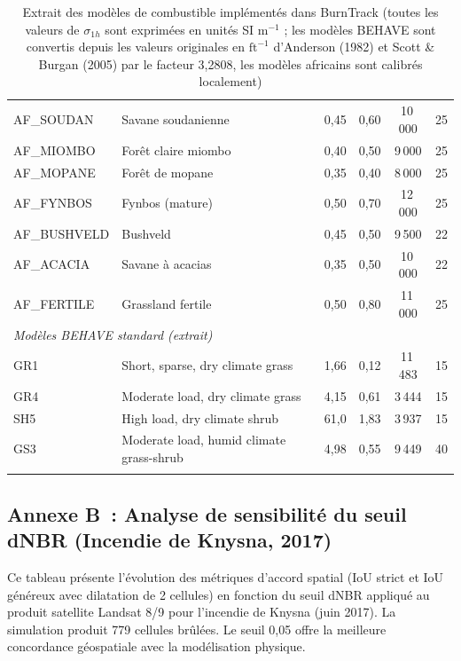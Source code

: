 \begin{small}
\begin{longtable}{|l|l|c|c|c|c|}
AF\_SOUDAN & Savane soudanienne & 0,45 & 0,60 & 10\,000 & 25 \\
AF\_MIOMBO & Forêt claire miombo & 0,40 & 0,50 & 9\,000 & 25 \\
AF\_MOPANE & Forêt de mopane & 0,35 & 0,40 & 8\,000 & 25 \\
AF\_FYNBOS & Fynbos (mature) & 0,50 & 0,70 & 12\,000 & 25 \\
AF\_BUSHVELD & Bushveld & 0,45 & 0,50 & 9\,500 & 22 \\
AF\_ACACIA & Savane à acacias & 0,35 & 0,50 & 10\,000 & 22 \\
AF\_FERTILE & Grassland fertile & 0,50 & 0,80 & 11\,000 & 25 \\
\hline
\multicolumn{6}{l}{\textit{Modèles BEHAVE standard (extrait)}} \\
\hline
GR1 & Short, sparse, dry climate grass & 1,66 & 0,12 & 11\,483 & 15 \\
GR4 & Moderate load, dry climate grass & 4,15 & 0,61 & 3\,444 & 15 \\
SH5 & High load, dry climate shrub & 61,0 & 1,83 & 3\,937 & 15 \\
GS3 & Moderate load, humid climate grass-shrub & 4,98 & 0,55 & 9\,449 & 40 \\
\hline
\caption{Extrait des modèles de combustible implémentés dans BurnTrack (toutes les valeurs de $\sigma_{1h}$ sont exprimées en unités SI $\text{m}^{-1}$ ; les modèles BEHAVE sont convertis depuis les valeurs originales en $\text{ft}^{-1}$ d'Anderson (1982) et Scott \& Burgan (2005) par le facteur 3,2808, les modèles africains sont calibrés localement)}
\end{longtable}
\end{small}

\subsection*{Annexe B~: Analyse de sensibilité du seuil dNBR (Incendie de Knysna, 2017)}

Ce tableau présente l'évolution des métriques d'accord spatial (IoU strict et IoU généreux avec dilatation de 2 cellules) en fonction du seuil dNBR appliqué au produit satellite Landsat 8/9 pour l'incendie de Knysna (juin 2017). La simulation produit 779 cellules brûlées. Le seuil 0,05 offre la meilleure concordance géospatiale avec la modélisation physique.

